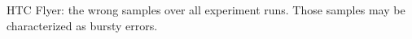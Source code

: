 HTC Flyer: the wrong samples over all experiment runs. Those samples may be characterized as bursty errors.
